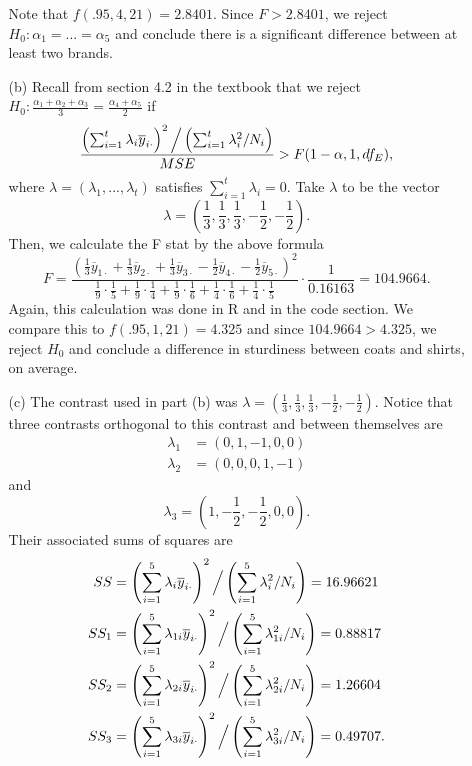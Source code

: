 \documentclass[11pt]{article}
\begin{document}
\begin{itemize}
\begin{itemize}
Note that $f(.95, 4, 21) = 2.8401$.  Since $F > 2.8401$, we reject $H_0 \colon \alpha_1 = ... = \alpha_5$ and conclude there is a significant difference between at least two brands.
\item[(b)]  Recall from section 4.2 in the textbook that we reject $H_0\colon \frac{\alpha_1+\alpha_2+\alpha_3}{3} = \frac{\alpha_4+\alpha_5}{2}$ if
\[
\frac{\left(\sum_{i=1}^t\lambda_i\overline{y}_{i\cdot}\right)^2 \Big{/} \left(\sum_{i=1}^t \lambda_i^2 / N_i\right)}{MSE} > F(1-\alpha, 1, df_E),
\]
where $\lambda = (\lambda_1, ..., \lambda_t)$ satisfies $\sum_{i=1}^t\lambda_i = 0$.  Take $\lambda$ to be the vector
\[
\lambda = \left( \frac{1}{3}, \frac{1}{3}, \frac{1}{3}, -\frac{1}{2}, -\frac{1}{2} \right).
\]
Then, we calculate the F stat by the above formula
\[
F = \frac{\left(\frac{1}{3}\overline{y}_{1\cdot} + \frac{1}{3}\overline{y}_{2\cdot}+\frac{1}{3}\overline{y}_{3\cdot} - \frac{1}{2}\overline{y}_{4\cdot} - \frac{1}{2}\overline{y}_{5\cdot}\right)^2}{\frac{1}{9}\cdot\frac{1}{5} + \frac{1}{9}\cdot\frac{1}{4} + \frac{1}{9}\cdot\frac{1}{6} + \frac{1}{4}\cdot\frac{1}{6} + \frac{1}{4}\cdot\frac{1}{5}} \cdot \frac{1}{0.16163} = 104.9664.
\]
Again, this calculation was done in R and in the code section.  We compare this to $f(.95, 1, 21) = 4.325$ and since $104.9664 > 4.325$, we reject $H_0$ and conclude a difference in sturdiness between coats and shirts, on average.
\item[(c)]  The contrast used in part (b) was 
$
\lambda = \left( \frac{1}{3}, \frac{1}{3}, \frac{1}{3}, -\frac{1}{2}, -\frac{1}{2} \right).
$  Notice that three contrasts orthogonal to this contrast and between themselves are
\begin{align*}
\lambda_1 &= (0, 1, -1, 0, 0) \\
\lambda_2 &= (0,0,0,1,-1)
\end{align*}
and
\[
\lambda_3 = \left(1, -\frac{1}{2}, -\frac{1}{2}, 0, 0\right).
\]
Their associated sums of squares are
\begin{align*}
SS &= \left(\sum_{i=1}^5\lambda_{i}\overline{y}_{i\cdot}\right)^2 \Big{/} \left(\sum_{i=1}^5 \lambda_{i}^2 / N_i\right) = 16.96621 \\
SS_1 &= \left(\sum_{i=1}^5\lambda_{1i}\overline{y}_{i\cdot}\right)^2 \Big{/} \left(\sum_{i=1}^5 \lambda_{1i}^2 / N_i\right) = 0.88817 \\
SS_2 &= \left(\sum_{i=1}^5\lambda_{2i}\overline{y}_{i\cdot}\right)^2 \Big{/} \left(\sum_{i=1}^5 \lambda_{2i}^2 / N_i\right) = 1.26604 \\
SS_3 &= \left(\sum_{i=1}^5\lambda_{3i}\overline{y}_{i\cdot}\right)^2 \Big{/} \left(\sum_{i=1}^5 \lambda_{3i}^2 / N_i\right) = 0.49707.

\end{align*}
\end{itemize}
\end{itemize}
\end{document}
